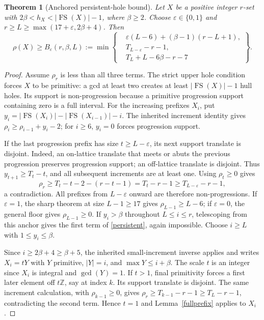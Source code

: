 \documentclass[11pt,a4paper]{article}
\newcommand{\FS}{\operatorname{FS}}
\newcommand{\Z}{\mathbb Z}
\newtheorem{theorem}{Theorem}[section]
\begin{document}
\begin{theorem}[Anchored persistent-hole bound]\label{holerho}
Let $X$ be a positive integer $r$-set with
$2\beta<h_X<|\FS(X)|-1$, where $\beta\ge2$. Choose
$\varepsilon\in\{0,1\}$ and
$r\ge L\ge\max(17+\varepsilon,2\beta+4)$. Then
\begin{equation}\label{persistent}
 \rho(X)\ge B_\varepsilon(r,\beta,L):=
 \min\left\{\begin{aligned}
 &\varepsilon(L-6)+(\beta-1)(r-L+1),\\
 &T_{L-\varepsilon}-r-1,\\
 &T_L+L-6\beta-r-7
 \end{aligned}\right\}.
\end{equation}
\end{theorem}
\begin{proof}
Assume $\rho_r$ is less than all three terms. The strict upper hole
condition forces $X$ to be primitive: a gcd at least two creates at
least $|\FS(X)|-1$ hull holes. Its support is non-progression because
a primitive progression support containing zero is a full interval.
For the increasing prefixes $X_i$, put
$y_i=|\FS(X_i)|-|\FS(X_{i-1})|-i$. The inherited increment identity
gives $\rho_i\ge\rho_{i-1}+y_i-2$; for $i\ge6$, $y_i=0$
forces progression support.

If the last progression prefix has size $t\ge L-\varepsilon$, its
next support translate is disjoint. Indeed, an on-lattice translate
that meets or abuts the previous progression preserves progression
support; an off-lattice translate is disjoint. Thus
$y_{t+1}\ge T_t-t$, and all subsequent increments are at least one.
Using $\rho_t\ge0$ gives
\[
 \rho_r\ge T_t-t-2-(r-t-1)=T_t-r-1
 \ge T_{L-\varepsilon}-r-1,
\]
a contradiction. All prefixes from $L-\varepsilon$ onward are
therefore non-progressions. If $\varepsilon=1$, the sharp theorem at
size $L-1\ge17$ gives $\rho_{L-1}\ge L-6$; if
$\varepsilon=0$, the general floor gives $\rho_{L-1}\ge0$.
If $y_i>\beta$ throughout $L\le i\le r$, telescoping from this
anchor gives the first term of \eqref{persistent}, again impossible.
Choose $i\ge L$ with $1\le y_i\le\beta$.

Since $i\ge2\beta+4\ge\beta+5$, the inherited small-increment
inverse applies and writes $X_i=tY$ with $Y$
primitive, $|Y|=i$, and $\max Y\le i+\beta$.
The scale $t$ is an integer since $X_i$ is integral and $\gcd(Y)=1$.
If $t>1$, final primitivity forces a first later element off $t\Z$,
say at index $k$. Its support translate is disjoint. The same increment
calculation, with $\rho_{k-1}\ge0$, gives
$\rho_r\ge T_{k-1}-r-1\ge T_L-r-1$, contradicting the second term.
Hence $t=1$ and Lemma~\ref{fullprefix} applies to $X_i$.


\end{proof}
\end{document}

